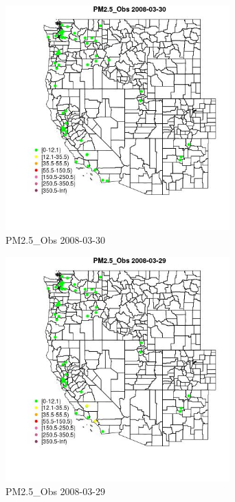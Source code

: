 \begin{figure} 
\centering  
\includegraphics[width=0.77\textwidth]{Code_Outputs/Report_ML_input_PM25_Step4_part_e_de_duplicated_aves_MapObsPM25_Obs2008-03-30.jpg} 
\caption{\label{fig:Report_ML_input_PM25_Step4_part_e_de_duplicated_avesMapObsPM25_Obs2008-03-30}PM2.5_Obs 2008-03-30} 
\end{figure} 
 

\begin{figure} 
\centering  
\includegraphics[width=0.77\textwidth]{Code_Outputs/Report_ML_input_PM25_Step4_part_e_de_duplicated_aves_MapObsPM25_Obs2008-03-29.jpg} 
\caption{\label{fig:Report_ML_input_PM25_Step4_part_e_de_duplicated_avesMapObsPM25_Obs2008-03-29}PM2.5_Obs 2008-03-29} 
\end{figure} 
 


